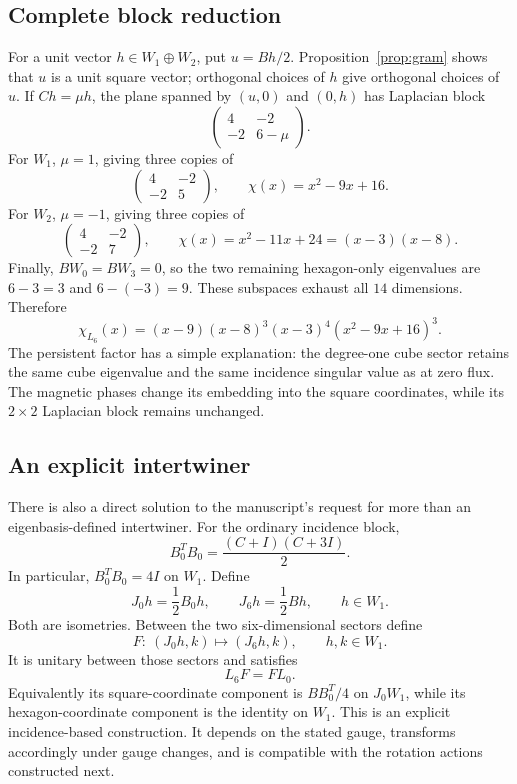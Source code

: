 \documentclass[11pt,a4paper]{article}
\begin{document}
\subsection{Complete block reduction}
For a unit vector $h\in W_1\oplus W_2$, put $u=Bh/2$. Proposition~\ref{prop:gram} shows that $u$ is a unit square vector; orthogonal choices of $h$ give orthogonal choices of $u$. If $Ch=\mu h$, the plane spanned by $(u,0)$ and $(0,h)$ has Laplacian block
\begin{equation}\label{eq:q6block}
 \begin{pmatrix}4&-2\\-2&6-\mu\end{pmatrix}.
\end{equation}
For $W_1$, $\mu=1$, giving three copies of
\[
 \begin{pmatrix}4&-2\\-2&5\end{pmatrix},\qquad
 \chi(x)=x^2-9x+16.
\]
For $W_2$, $\mu=-1$, giving three copies of
\[
 \begin{pmatrix}4&-2\\-2&7\end{pmatrix},\qquad
 \chi(x)=x^2-11x+24=(x-3)(x-8).
\]
Finally, $BW_0=BW_3=0$, so the two remaining hexagon-only eigenvalues are $6-3=3$ and $6-(-3)=9$. These subspaces exhaust all $14$ dimensions. Therefore
\begin{equation}\boxed{
 \chi_{L_6}(x)=(x-9)(x-8)^3(x-3)^4(x^2-9x+16)^3.}
\end{equation}
The persistent factor has a simple explanation: the degree-one cube sector retains the same cube eigenvalue and the same incidence singular value as at zero flux. The magnetic phases change its embedding into the square coordinates, while its $2\times2$ Laplacian block remains unchanged.

\subsection{An explicit intertwiner}
There is also a direct solution to the manuscript's request for more than an eigenbasis-defined intertwiner. For the ordinary incidence block,
\begin{equation}
 B_0^TB_0=\frac{(C+I)(C+3I)}2.
\end{equation}
In particular, $B_0^TB_0=4I$ on $W_1$. Define
\[
 J_0h=\frac12B_0h,\qquad J_6h=\frac12Bh,\qquad h\in W_1.
\]
Both are isometries. Between the two six-dimensional sectors define
\begin{equation}\label{eq:F}
 F:\ (J_0h,k)\longmapsto(J_6h,k),\qquad h,k\in W_1.
\end{equation}
It is unitary between those sectors and satisfies
\[
 L_6F=FL_0.
\]
Equivalently its square-coordinate component is $BB_0^T/4$ on $J_0W_1$, while its hexagon-coordinate component is the identity on $W_1$. This is an explicit incidence-based construction. It depends on the stated gauge, transforms accordingly under gauge changes, and is compatible with the rotation actions constructed next.
\end{document}
